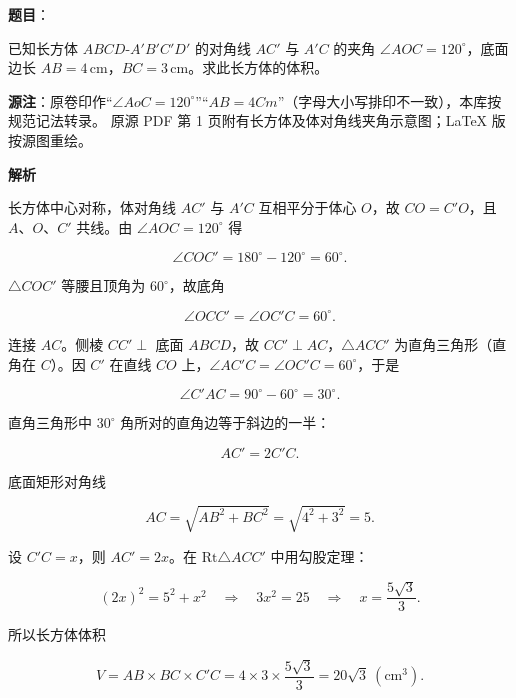 \begin{answer}

\textbf{题目}：

已知长方体 $ABCD\text{-}A'B'C'D'$ 的对角线 $AC'$ 与 $A'C$ 的夹角 $\angle AOC=120^\circ$，底面边长 $AB=4\,\mathrm{cm}$，$BC=3\,\mathrm{cm}$。求此长方体的体积。

\begin{gktip}
\textbf{源注}：原卷印作“$\angle AoC=120^\circ$”“$AB=4Cm$”（字母大小写排印不一致），本库按规范记法转录。
原源 PDF 第 1 页附有长方体及体对角线夹角示意图；LaTeX 版按源图重绘。
\end{gktip}
\nopagebreak[4]
\begin{center}\end{center}
\nopagebreak[4]
\textbf{解析}

长方体中心对称，体对角线 $AC'$ 与 $A'C$ 互相平分于体心 $O$，故 $CO=C'O$，且 $A\text{、}O\text{、}C'$ 共线。由 $\angle AOC=120^\circ$ 得

\nopagebreak[4]
\[
\angle COC'=180^\circ-120^\circ=60^\circ.
\]

$\triangle COC'$ 等腰且顶角为 $60^\circ$，故底角

\nopagebreak[4]
\[
\angle OCC'=\angle OC'C=60^\circ.
\]

连接 $AC$。侧棱 $CC'\perp$ 底面 $ABCD$，故 $CC'\perp AC$，$\triangle ACC'$ 为直角三角形（直角在 $C$）。因 $C'$ 在直线 $CO$ 上，$\angle AC'C=\angle OC'C=60^\circ$，于是

\nopagebreak[4]
\[
\angle C'AC=90^\circ-60^\circ=30^\circ.
\]

直角三角形中 $30^\circ$ 角所对的直角边等于斜边的一半：

\nopagebreak[4]
\[
AC'=2C'C.
\]

底面矩形对角线

\nopagebreak[4]
\[
AC=\sqrt{AB^2+BC^2}=\sqrt{4^2+3^2}=5.
\]

设 $C'C=x$，则 $AC'=2x$。在 $\mathrm{Rt}\triangle ACC'$ 中用勾股定理：

\nopagebreak[4]
\[
(2x)^2=5^2+x^2
\quad\Longrightarrow\quad
3x^2=25
\quad\Longrightarrow\quad
x=\frac{5\sqrt3}{3}.
\]

所以长方体体积

\nopagebreak[4]
\[
V=AB\times BC\times C'C=4\times3\times\frac{5\sqrt3}{3}=20\sqrt3\ (\mathrm{cm^3}).
\]
\nopagebreak[4]
\begin{center}\end{center}
\nopagebreak[4]

\end{answer}

